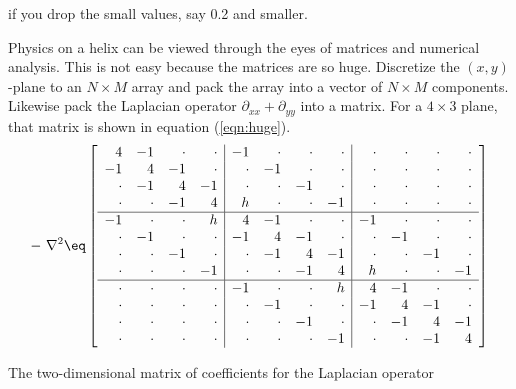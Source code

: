 if you drop the small values, say 0.2 and smaller.
\par
Physics on a helix can be viewed through the eyes
of matrices and numerical analysis.
This is not easy because the matrices are so huge.
Discretize the $(x,y)$-plane to an $N\times M$ array
and pack the array into a vector of $N\times M$ components.
Likewise pack the Laplacian operator $\partial_{xx}+\partial_{yy}$
into a matrix.
For a $4\times 3$ plane, that matrix is shown in equation (\ref{eqn:huge}).
\begin{equation}
\label{eqn:huge}
-\ \nabla^2 \eq
\left[
\begin{array}{rrrr|rrrr|rrrr}
  4 & -1 & \cdot & \cdot 
& -1 & \cdot & \cdot & \cdot 
& \cdot & \cdot & \cdot & \cdot  \\
  -1  &   4  &   -1     &  \cdot 
&  \cdot &-1 & \cdot  & \cdot 
& \cdot  &  \cdot  &  \cdot &  \cdot    \\
\cdot & -1  &   4  & -1  
&  \cdot  &  \cdot &-1  &  \cdot 
&  \cdot  &  \cdot  &  \cdot  &  \cdot   \\
\cdot &  \cdot & -1 &   4  
&  h  &  \cdot  &  \cdot &-1 
&  \cdot  &  \cdot  &  \cdot  &  \cdot  \\
\hline
  -1  &  \cdot  &  \cdot  &  h 
&   4   &  -1   &  \cdot  &  \cdot 
& -1  &  \cdot  &  \cdot &  \cdot 
\\
   \cdot &-1 & \cdot  &  \cdot 
& -1  &   4  &   -1     &  \cdot 
&  \cdot &-1 & \cdot  &  \cdot 
\\
  \cdot  &  \cdot &-1  &  \cdot 
&  \cdot &   -1     &   4   & -1  
& \cdot  &  \cdot &-1  &  \cdot 
\\
  \cdot  &  \cdot  &  \cdot &-1 
& \cdot  &  \cdot  & -1  &   4  
& h  &  \cdot  &  \cdot &-1 
\\
\hline
  \cdot  &  \cdot  &  \cdot  &  \cdot 
& -1  &  \cdot  &  \cdot  &  h 
&   4   &  -1   &  \cdot  &  \cdot 
\\
  \cdot  &  \cdot  &  \cdot  &  \cdot 
&  \cdot &-1 & \cdot  &  \cdot 
& -1  &   4  &   -1     &  \cdot 
\\
  \cdot  &  \cdot  &  \cdot  &  \cdot 
& \cdot  &  \cdot &-1  &  \cdot 
&  \cdot &   -1     &   4   & -1  
\\
  \cdot  &  \cdot  &  \cdot  &  \cdot 
& \cdot  &  \cdot  &  \cdot &-1 
& \cdot  &  \cdot  & -1  &   4  
\end{array}
\right]
\end{equation}
\par\noindent
The two-dimensional matrix of coefficients for the Laplacian operator
